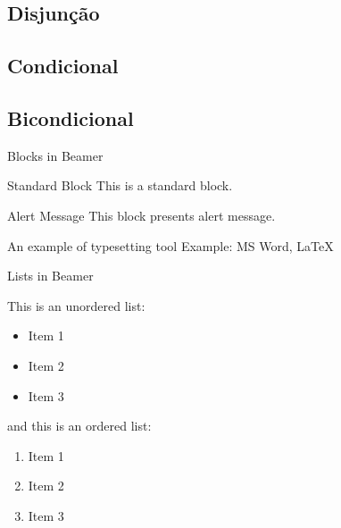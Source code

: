 \documentclass[10pt, headsepline, captions=tableabove,xcolor=table]{beamer}
\begin{document}
\subsection{Disjunção}
%
\subsection{Condicional}
%
\subsection{Bicondicional}
%

\begin{frame}{Blocks in Beamer}
    \begin{block}{Standard Block}
        This is a standard block.
    \end{block}
    \begin{alertblock}{Alert Message}
        This block presents alert message.
    \end{alertblock}
    \begin{exampleblock}{An example of typesetting tool}
        Example: MS Word, \LaTeX{}
    \end{exampleblock}
\end{frame}
%
\begin{frame}{Lists in Beamer}

    This is an unordered list:
    \begin{itemize}
        \item Item 1
        \item Item 2
        \item Item 3
    \end{itemize}
    
    and this is an ordered list:
    \begin{enumerate}
        \item Item 1
        \item Item 2
        \item Item 3
    \end{enumerate}
    
    \end{frame}
\end{document}

